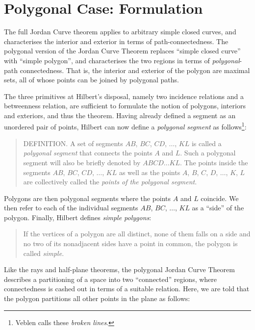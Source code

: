 \section{Polygonal Case: Formulation}\label{sec:JordanCurveExplanation}
The full Jordan Curve theorem applies to arbitrary simple closed curves, and characterises the interior and exterior in terms of path-connectedness. The polygonal version of the Jordan Curve Theorem replaces ``simple closed curve'' with ``simple polygon'', and characterises the two regions in terms of \emph{polygonal}-path connectedness. That is, the interior and exterior of the polygon are maximal sets, all of whose points can be joined by polygonal paths. 

The three primitives at Hilbert's disposal, namely two incidence relations and a betweenness relation, are sufficient to formulate the notion of polygons, interiors and exteriors, and thus the theorem. Having already defined a segment as an unordered pair of points, Hilbert can now define a \emph{polygonal segment} as follows\footnote{Veblen calls these \emph{broken lines}.}:

\begin{quote}
DEFINITION. A set of segments $AB$, $BC$, $CD$, $\ldots$, $KL$ is called a \emph{polygonal segment} that connects the points $A$ and $L$. Such a polygonal segment will also be briefly denoted by $ABCD\ldots KL$. The points inside the segments $AB$, $BC$, $CD$, $\ldots$, $KL$ as well as the points $A$, $B$, $C$, $D$, $\ldots$, $K$, $L$ are collectively called the \emph{points of the polygonal segment}. 
\end{quote}

Polygons are then polygonal segments where the points $A$ and $L$ coincide. We then refer to each of the individual segments $AB$, $BC$, $\ldots$, $KL$ as a ``side'' of the polygon. Finally, Hilbert defines \emph{simple polygons}:

\begin{quote}
If the vertices of a polygon are all distinct, none of them falls on a side and no two of its nonadjacent sides have a point in common, the polygon is called \emph{simple}.
\end{quote}

Like the rays and half-plane theorems, the polygonal Jordan Curve Theorem describes a partitioning of a space into two ``connected'' regions, where connectedness is cashed out in terms of a suitable relation. Here, we are told that the polygon partitions all other points in the plane as follows:

